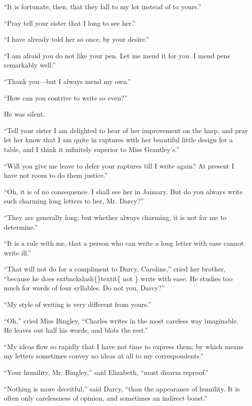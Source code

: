 \documentclass[10pt]{book}
\begin{document}
   “It is fortunate, then, that they fall to my lot instead of to yours.”
  

   “Pray tell your sister that I long to see her.”
  

   “I have already told her so once, by your desire.”
  

   “I am afraid you do not like your pen. Let me mend it for you. I mend
pens remarkably well.”
  

   “Thank you—but I always mend my own.”
  

   “How can you contrive to write so even?”
  

   He was silent.
  

   “Tell your sister I am delighted to hear of her improvement on the harp,
and pray let her know that I am quite in raptures with her beautiful
little design for a table, and I think it infinitely superior to Miss
Grantley’s.”
  

   “Will you give me leave to defer your raptures till I write again? At
present I have not room to do them justice.”
  

   “Oh, it is of no consequence. I shall see her in January. But do you
always write such charming long letters to her, Mr. Darcy?”
  

   “They are generally long; but whether always charming, it is not for me
to determine.”
  

   “It is a rule with me, that a person who can write a long letter with
ease cannot write ill.”
  

   “That will not do for a compliment to Darcy, Caroline,” cried her
brother, “because he does
   	extbackslash\{\}textit\{
    not
   \}
   write with ease.
   He studies too much
for words of four syllables. Do not you, Darcy?”
  

   “My style of writing is very different from yours.”
  

   “Oh,” cried Miss Bingley, “Charles writes in the most careless way
imaginable. He leaves out half his words, and blots the rest.”
  

   “My ideas flow so rapidly that I have not time to express them; by which
means my letters sometimes convey no ideas at all to my correspondents.”
  

   “Your humility, Mr. Bingley,” said Elizabeth, “must disarm reproof.”
  

   “Nothing is more deceitful,” said Darcy, “than the appearance of
humility. It is often only carelessness of opinion, and sometimes an
indirect boast.”
  
\end{document}
